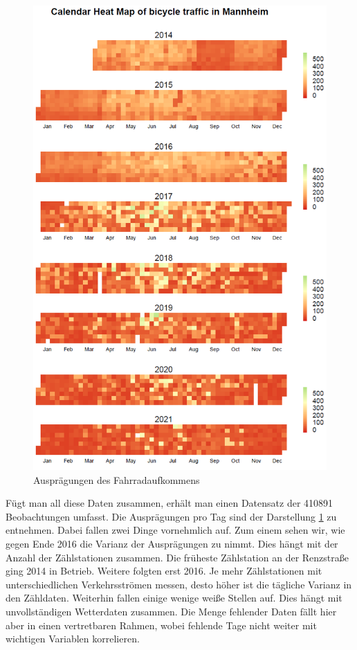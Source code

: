 \documentclass[a4paper,12pt]{thesis}
\begin{document}
\begin{figure}[!ht]
	\centering
	\includegraphics[width=\textwidth]{Plots/CalendarHeatMap.png}
	\caption{Ausprägungen des Fahrradaufkommens}
	\label{fig:calendarheatmap}
\end{figure}

Fügt man all diese Daten zusammen, erhält man einen Datensatz der 410891 Beobachtungen umfasst. Die Ausprägungen pro Tag sind der Darstellung \ref{fig:calendarheatmap} zu entnehmen. Dabei fallen zwei Dinge vornehmlich auf. Zum einem sehen wir, wie gegen Ende 2016 die Varianz der Ausprägungen zu nimmt. Dies hängt mit der Anzahl der Zählstationen zusammen. Die früheste Zählstation an der Renzstraße ging 2014 in Betrieb. Weitere folgten erst 2016. Je mehr Zählstationen mit unterschiedlichen Verkehrsströmen messen, desto höher ist die tägliche Varianz in den Zähldaten. Weiterhin fallen einige wenige weiße Stellen auf. Dies hängt mit unvollständigen Wetterdaten zusammen. Die Menge fehlender Daten fällt hier aber in einen vertretbaren Rahmen, wobei fehlende Tage nicht weiter mit wichtigen Variablen korrelieren.
\end{document}

